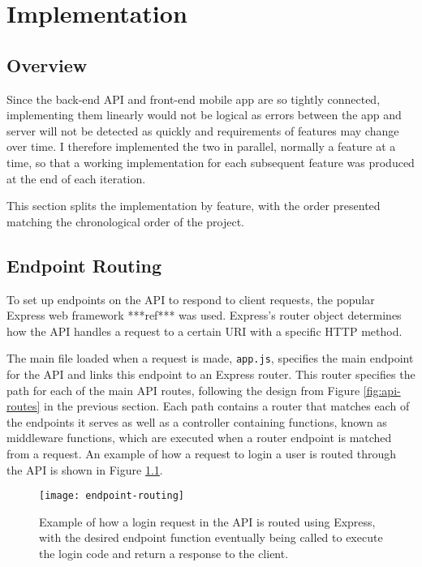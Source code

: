 \chapter{Implementation}


\section{Overview}

Since the back-end API and front-end mobile app are so tightly connected, implementing them linearly would not be logical as errors between the app and server will not be detected as quickly and requirements of features may change over time. I therefore implemented the two in parallel, normally a feature at a time, so that a working implementation for each subsequent feature was produced at the end of each iteration.

This section splits the implementation by feature, with the order presented matching the chronological order of the project.

\section{Endpoint Routing}

To set up endpoints on the API to respond to client requests, the popular Express web framework ***ref*** was used. Express's router object determines how the API handles a request to a certain URI with a specific HTTP method.

The main file loaded when a request is made, \texttt{app.js}, specifies the main endpoint for the API and links this endpoint to an Express router. This router specifies the path for each of the main API routes, following the design from Figure \ref{fig:api-routes} in the previous section. Each path contains a router that matches each of the endpoints it serves as well as a controller containing functions, known as middleware functions, which are executed when a router endpoint is matched from a request. An example of how a request to login a user is routed through the API is shown in Figure \ref{fig:endpoint-routing}.

\begin{figure}[hbt]
  \centering
  \texttt{[image: endpoint-routing]}
  \caption{Example of how a login request in the API is routed using Express, with the desired endpoint function eventually being called to execute the login code and return a response to the client.}
  \label{fig:endpoint-routing}
\end{figure}


